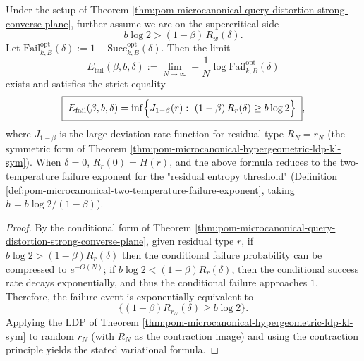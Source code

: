 \begin{theorem}\label{thm:pom-microcanonical-query-distortion-failure-exponent}
Under the setup of Theorem \ref{thm:pom-microcanonical-query-distortion-strong-converse-plane},
further assume we are on the supercritical side
\[
b\log 2>(1-\beta)\,R_w(\delta).
\]
Let \(\mathrm{Fail}^{\mathrm{opt}}_{k,B}(\delta):=1-\mathrm{Succ}^{\mathrm{opt}}_{k,B}(\delta)\).
Then the limit
\[
E_{\mathrm{fail}}(\beta,b,\delta)
:=\lim_{N\to\infty}-\frac{1}{N}\log \mathrm{Fail}^{\mathrm{opt}}_{k,B}(\delta)
\]
exists and satisfies the strict equality
\[
\boxed{\;
E_{\mathrm{fail}}(\beta,b,\delta)
=\inf\Bigl\{J_{1-\beta}(r):\ (1-\beta)\,R_r(\delta)\ge b\log 2\Bigr\}\; } ,
\]
where \(J_{1-\beta}\) is the large deviation rate function for residual type \(R_N=r_N\) (the symmetric form of Theorem \ref{thm:pom-microcanonical-hypergeometric-ldp-kl-sym}).
When \(\delta=0\), \(R_r(0)=H(r)\), and the above formula reduces to the two-temperature failure exponent for the "residual entropy threshold" (Definition \ref{def:pom-microcanonical-two-temperature-failure-exponent}, taking \(h=b\log 2/(1-\beta)\)).
\end{theorem}
\begin{proof}
By the conditional form of Theorem \ref{thm:pom-microcanonical-query-distortion-strong-converse-plane},
given residual type \(r\), if \(b\log 2>(1-\beta)R_r(\delta)\) then the conditional failure probability can be compressed to \(e^{-\Theta(N)}\);
if \(b\log 2<(1-\beta)R_r(\delta)\), then the conditional success rate decays exponentially, and thus the conditional failure approaches \(1\).
Therefore, the failure event is exponentially equivalent to
\[
\{(1-\beta)R_{r_N}(\delta)\ge b\log 2\}.
\]
Applying the LDP of Theorem \ref{thm:pom-microcanonical-hypergeometric-ldp-kl-sym} to random \(r_N\) (with \(R_N\) as the contraction image) and using the contraction principle yields the stated variational formula.
\end{proof}

